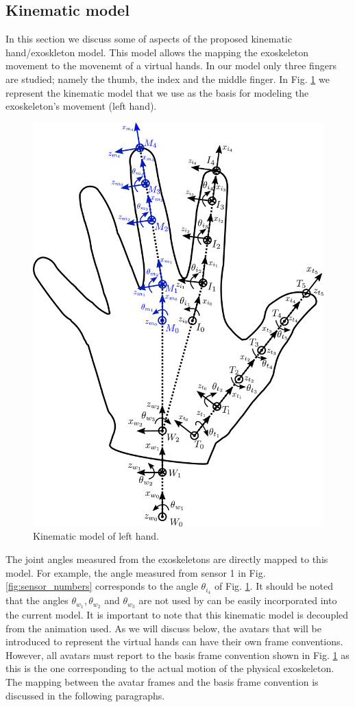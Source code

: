 \subsection{Kinematic model}
In this section we discuss some of aspects of the 
proposed kinematic hand/exoskleton model. This model
allows the mapping the exoskeleton movement to the movenemt of a
virtual hands. In our model only three fingers are studied; namely the 
thumb, the index and the middle finger. In Fig. \ref{fig:kinematic_model}
we represent the kinematic model that we use as the basis for modeling the
exoskeleton's movement (left hand). 
\begin{figure}
    \centering\includegraphics[width=0.8 \linewidth]{Figures/kinematic_model.pdf}
    \caption{Kinematic model of left hand.}
    \label{fig:kinematic_model}
\end{figure}
The joint angles measured from the exoskeletons are directly mapped to this 
model. For example, the angle measured from sensor 1 in Fig. \ref{fig:sensor_numbers}
corresponds to the angle $\theta_{i_{4}}$ of Fig. \ref{fig:kinematic_model}.
It should be noted that the angles $\theta_{w_1}, \theta_{w_2}$ and 
$\theta_{w_3}$ are not used by can be easily incorporated into the current model.
It is important to note that this kinematic model is
decoupled from the animation used. As we will discuss below, the avatars 
that will be introduced to represent the virtual hands can have their own 
frame conventions. However, all avatars must report to the basis frame 
convention shown in Fig. \ref{fig:kinematic_model} as this is the one 
corresponding to the actual motion of the physical exoskeleton. The mapping 
between the avatar frames and the basis frame convention is discussed 
in the following paragraphs. 

